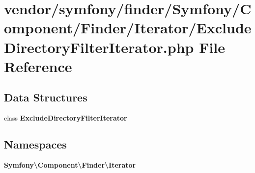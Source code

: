 \section{vendor/symfony/finder/\+Symfony/\+Component/\+Finder/\+Iterator/\+Exclude\+Directory\+Filter\+Iterator.php File Reference}
\label{_exclude_directory_filter_iterator_8php}
\subsection*{Data Structures}
\begin{DoxyCompactItemize}
\item 
class {\bf Exclude\+Directory\+Filter\+Iterator}
\end{DoxyCompactItemize}
\subsection*{Namespaces}
\begin{DoxyCompactItemize}
\item 
 {\bf Symfony\textbackslash{}\+Component\textbackslash{}\+Finder\textbackslash{}\+Iterator}
\end{DoxyCompactItemize}
